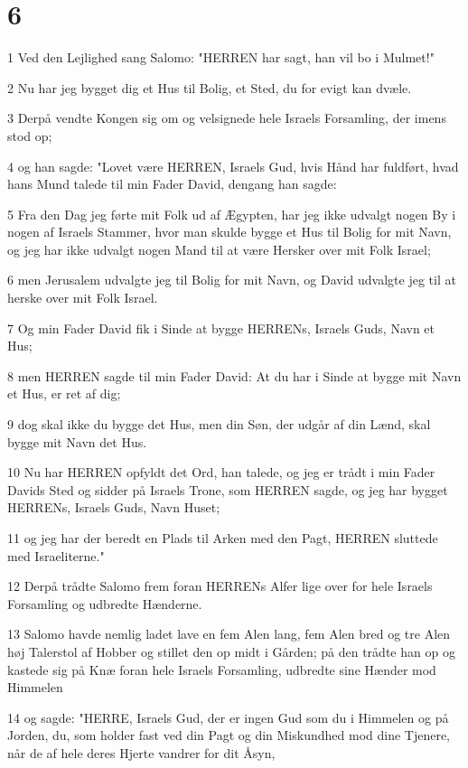\chapter{6}

\par 1 Ved den Lejlighed sang Salomo: "HERREN har sagt, han vil bo i Mulmet!"
\par 2 Nu har jeg bygget dig et Hus til Bolig, et Sted, du for evigt kan dvæle.
\par 3 Derpå vendte Kongen sig om og velsignede hele Israels Forsamling, der imens stod op;
\par 4 og han sagde: "Lovet være HERREN, Israels Gud, hvis Hånd har fuldført, hvad hans Mund talede til min Fader David, dengang han sagde:
\par 5 Fra den Dag jeg førte mit Folk ud af Ægypten, har jeg ikke udvalgt nogen By i nogen af Israels Stammer, hvor man skulde bygge et Hus til Bolig for mit Navn, og jeg har ikke udvalgt nogen Mand til at være Hersker over mit Folk Israel;
\par 6 men Jerusalem udvalgte jeg til Bolig for mit Navn, og David udvalgte jeg til at herske over mit Folk Israel.
\par 7 Og min Fader David fik i Sinde at bygge HERRENs, Israels Guds, Navn et Hus;
\par 8 men HERREN sagde til min Fader David: At du har i Sinde at bygge mit Navn et Hus, er ret af dig;
\par 9 dog skal ikke du bygge det Hus, men din Søn, der udgår af din Lænd, skal bygge mit Navn det Hus.
\par 10 Nu har HERREN opfyldt det Ord, han talede, og jeg er trådt i min Fader Davids Sted og sidder på Israels Trone, som HERREN sagde, og jeg har bygget HERRENs, Israels Guds, Navn Huset;
\par 11 og jeg har der beredt en Plads til Arken med den Pagt, HERREN sluttede med Israeliterne."
\par 12 Derpå trådte Salomo frem foran HERRENs Alfer lige over for hele Israels Forsamling og udbredte Hænderne.
\par 13 Salomo havde nemlig ladet lave en fem Alen lang, fem Alen bred og tre Alen høj Talerstol af Hobber og stillet den op midt i Gården; på den trådte han op og kastede sig på Knæ foran hele Israels Forsamling, udbredte sine Hænder mod Himmelen
\par 14 og sagde: "HERRE, Israels Gud, der er ingen Gud som du i Himmelen og på Jorden, du, som holder fast ved din Pagt og din Miskundhed mod dine Tjenere, når de af hele deres Hjerte vandrer for dit Åsyn,
